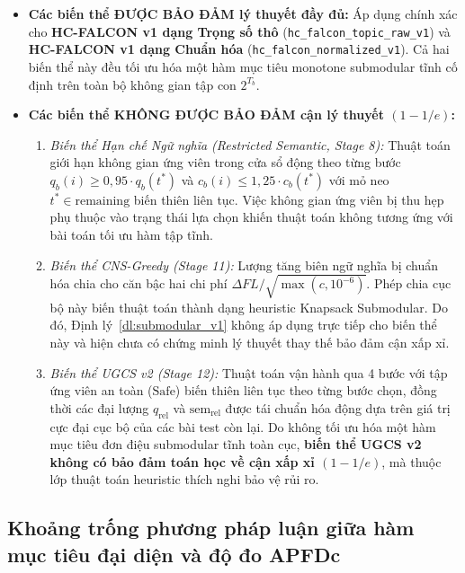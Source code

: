 \begin{itemize}
    \item \textbf{Các biến thể ĐƯỢC BẢO ĐẢM lý thuyết đầy đủ:}
    Áp dụng chính xác cho \textbf{HC-FALCON v1 dạng Trọng số thô} (\texttt{hc\_falcon\_topic\_raw\_v1}) và \textbf{HC-FALCON v1 dạng Chuẩn hóa} (\texttt{hc\_falcon\_normalized\_v1}). Cả hai biến thể này đều tối ưu hóa một hàm mục tiêu monotone submodular tĩnh cố định trên toàn bộ không gian tập con $2^{T_b}$.
    
    \item \textbf{Các biến thể KHÔNG ĐƯỢC BẢO ĐẢM cận lý thuyết $(1 - 1/e)$:}
    \begin{enumerate}
        \item \textit{Biến thể Hạn chế Ngữ nghĩa (Restricted Semantic, Stage 8):} Thuật toán giới hạn không gian ứng viên trong cửa sổ động theo từng bước $q_b(i) \ge 0{,}95 \cdot q_b(t^*)$ và $c_b(i) \le 1{,}25 \cdot c_b(t^*)$ với mỏ neo $t^* \in \text{remaining}$ biến thiên liên tục. Việc không gian ứng viên bị thu hẹp phụ thuộc vào trạng thái lựa chọn khiến thuật toán không tương ứng với bài toán tối ưu hàm tập tĩnh.
        \item \textit{Biến thể CNS-Greedy (Stage 11):} Lượng tăng biên ngữ nghĩa bị chuẩn hóa chia cho căn bậc hai chi phí $\Delta FL / \sqrt{\max(c, 10^{-6})}$. Phép chia cục bộ này biến thuật toán thành dạng heuristic Knapsack Submodular. Do đó, Định lý~\ref{dl:submodular_v1} không áp dụng trực tiếp cho biến thể này và hiện chưa có chứng minh lý thuyết thay thế bảo đảm cận xấp xỉ.
        \item \textit{Biến thể UGCS v2 (Stage 12):} Thuật toán vận hành qua 4 bước với tập ứng viên an toàn ($\text{Safe}$) biến thiên liên tục theo từng bước chọn, đồng thời các đại lượng $q_{\text{rel}}$ và $\text{sem}_{\text{rel}}$ được tái chuẩn hóa động dựa trên giá trị cực đại cục bộ của các bài test còn lại. Do không tối ưu hóa một hàm mục tiêu đơn điệu submodular tĩnh toàn cục, \textbf{biến thể UGCS v2 không có bảo đảm toán học về cận xấp xỉ $(1 - 1/e)$}, mà thuộc lớp thuật toán heuristic thích nghi bảo vệ rủi ro.
    \end{enumerate}
\end{itemize}

\subsection{Khoảng trống phương pháp luận giữa hàm mục tiêu đại diện và độ đo APFDc}
\label{subsec:proxy_apfdc_gap}


